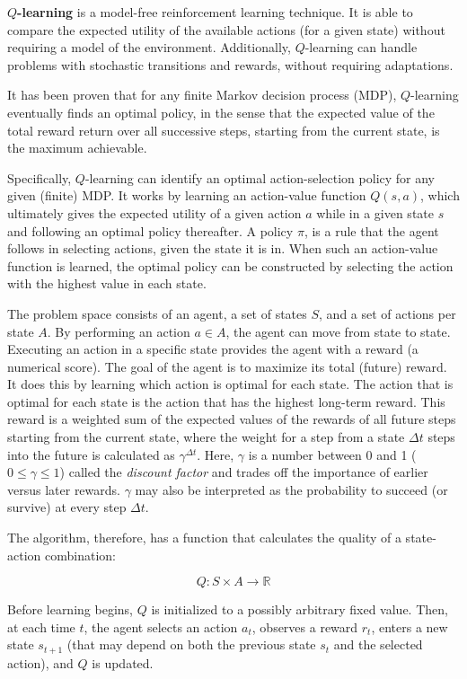 \documentclass{article}
\begin{document}
{\bf $Q$-learning} is a model-free reinforcement learning technique.
It is able to compare the expected utility of the available actions
(for a given state) without requiring a model of the environment.
Additionally, $Q$-learning can handle problems with stochastic
transitions and rewards, without requiring adaptations.

It has been proven that for any finite Markov decision process (MDP),
$Q$-learning eventually finds an optimal policy, in the sense that the
expected value of the total reward return over all successive steps,
starting from the current state, is the maximum achievable.

Specifically, $Q$-learning can identify an optimal
action-selection policy for any given (finite) MDP.
It works by learning an action-value function $Q(s, a)$, which
ultimately gives the expected utility of a given action $a$
while in a given state $s$ and following an optimal policy thereafter.
A policy $\pi$, is a rule that the agent follows in selecting actions,
given the state it is in. When such an action-value function is learned,
the optimal policy can be constructed by selecting
the action with the highest value in each state.

The problem space consists of an agent, a set of states $S$,
and a set of actions per state $A$. By performing an action $a \in A$,
the agent can move from state to state. Executing an action in a
specific state provides the agent with a reward (a numerical score).
The goal of the agent is to maximize its total (future) reward.
It does this by learning which action is optimal for each state.
The action that is optimal for each state is the action that has
the highest long-term reward. This reward is a weighted sum of
the expected values of the rewards of all future steps starting from
the current state, where the weight for a step from a state $\Delta t$
steps into the future is calculated as $\gamma^{\Delta t}$.
Here, $\gamma$ is a number between 0 and 1 ($0 \le \gamma \le 1$) called
the {\it{discount factor}} and trades off the importance of earlier
versus later rewards. $\gamma$ may also be interpreted as the
probability to succeed (or survive) at every step $\Delta t$.

The algorithm, therefore, has a function that calculates
the quality of a state-action combination:

$$Q: S \times A \to \mathbb{R}$$

Before learning begins, $Q$ is initialized to a possibly arbitrary fixed value.
Then, at each time $t$, the agent selects an action $a_t$, observes a reward $r_t$,
enters a new state $s_{t+1}$ (that may depend on both the previous state $s_t$
and the selected action), and $Q$ is updated.
\end{document}
